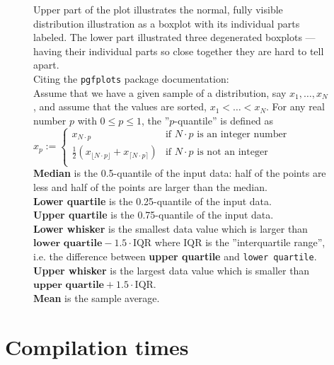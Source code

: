 \documentclass[en]{pracamgr}
\begin{document}
\begin{appendices}
\begin{figure}[H]
\caption{Upper part of the plot illustrates the normal, fully visible distribution illustration as a boxplot with its individual parts labeled. The lower part illustrated three degenerated boxplots --- having their individual parts so close together they are hard to tell apart. \\
Citing the \texttt{pgfplots} package documentation: \\
Assume that we have a given sample of a distribution, say $x_1, \ldots, x_N$ , and assume that the values are sorted, $x_1 < \ldots < x_N$. For any real number $p$ with $0 \leq p \leq 1$, the ''$p$-quantile'' is defined as \\
$x_p := \begin{cases}
x_{N \cdot p} & \text{if $N \cdot p$ is an integer number} \\
\frac{1}{2}(x_{\lfloor N \cdot p \rfloor} + x_{\lceil N \cdot p \rceil}) & \text{if $N \cdot p$ is not an integer} \\
\end{cases}$ \\
\textbf{Median} is the 0.5-quantile of the input data: half of the points are less and half of the points are larger than the median. \\
\textbf{Lower quartile} is the 0.25-quantile of the input data. \\
\textbf{Upper quartile} is the 0.75-quantile of the input data. \\
\textbf{Lower whisker} is the smallest data value which is larger than $\textbf{lower quartile} - 1.5 \cdot \text{IQR}$ where IQR is the ''interquartile range'', i.e. the difference between \textbf{upper quartile} and \texttt{lower quartile}. \\
\textbf{Upper whisker} is the largest data value which is smaller than $\textbf{upper quartile} + 1.5 \cdot \text{IQR}$. \\
\textbf{Mean} is the sample average.
}
\label{figure:plot_legend}
\end{figure}


\section{Compilation times}


\end{appendices}
\end{document}
